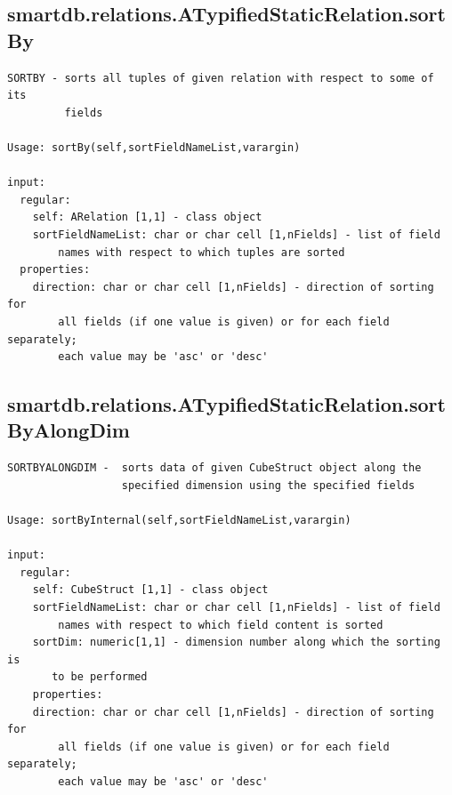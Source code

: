 \documentclass[letterpaper,10pt,english]{sphinxmanual}
\begin{document}
\subsection{smartdb.relations.ATypifiedStaticRelation.sortBy}
\label{chap_functions:smartdb-relations-atypifiedstaticrelation-sortby}
\begin{Verbatim}[commandchars=\\\{\}]
SORTBY - sorts all tuples of given relation with respect to some of its
         fields

Usage: sortBy(self,sortFieldNameList,varargin)

input:
  regular:
    self: ARelation [1,1] - class object
    sortFieldNameList: char or char cell [1,nFields] - list of field
        names with respect to which tuples are sorted
  properties:
    direction: char or char cell [1,nFields] - direction of sorting for
        all fields (if one value is given) or for each field separately;
        each value may be 'asc' or 'desc'
\end{Verbatim}


\subsection{smartdb.relations.ATypifiedStaticRelation.sortByAlongDim}
\label{chap_functions:smartdb-relations-atypifiedstaticrelation-sortbyalongdim}
\begin{Verbatim}[commandchars=\\\{\}]
SORTBYALONGDIM -  sorts data of given CubeStruct object along the
                  specified dimension using the specified fields

Usage: sortByInternal(self,sortFieldNameList,varargin)

input:
  regular:
    self: CubeStruct [1,1] - class object
    sortFieldNameList: char or char cell [1,nFields] - list of field
        names with respect to which field content is sorted
    sortDim: numeric[1,1] - dimension number along which the sorting is
       to be performed
    properties:
    direction: char or char cell [1,nFields] - direction of sorting for
        all fields (if one value is given) or for each field separately;
        each value may be 'asc' or 'desc'
\end{Verbatim}
\end{document}

